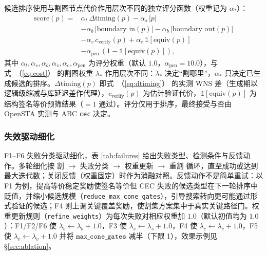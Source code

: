 \documentclass[journal]{IEEEtran}
\renewcommand{\eqref}[1]{\textup{（\ref{#1}）}}
\begin{document}
候选排序使用与割图节点代价作用层次不同的独立评分函数（权重记为 $\alpha_*$）：
{\small
\begin{equation}\label{eq:score}
\begin{split}
\mathrm{score}(p) = {}&\alpha_t\,\Delta\mathrm{timing}(p) - \alpha_s\,|p| \\
&- \alpha_b\,|\mathrm{boundary\_in}(p)| - \alpha_b\,|\mathrm{boundary\_out}(p)| \\
&- \alpha_v\,c_{\mathrm{verify}}(p) + \alpha_e\,\mathbb{1}[\mathrm{equiv}(p)] \\
&- \alpha_{\mathrm{pen}}\,(1-\mathbb{1}[\mathrm{equiv}(p)]),
\end{split}
\end{equation}
}
其中 $\alpha_t,\alpha_s,\alpha_b,\alpha_v,\alpha_e,\alpha_{\mathrm{pen}}$ 为评分权重（默认 $1.0$，$\alpha_{\mathrm{pen}}=10.0$），与式~\eqref{eq:cost} 的割图权重 $\lambda_*$ 作用层次不同：$\lambda_*$ 决定“割哪里”，$\alpha_*$ 只决定已生成候选的排序。$\Delta\mathrm{timing}(p)$ 即式~\eqref{eq:dtiming} 的实测 WNS 差（生成期以逻辑级缩减与库延迟差作代理），$c_{\mathrm{verify}}(p)$ 为估计验证代价，$\mathbb{1}[\mathrm{equiv}(p)]$ 为结构签名等价预筛结果（$=1$ 通过）。评分仅用于排序，最终接受与否由 OpenSTA 实测与 ABC \texttt{cec} 决定。

\subsubsection{失效驱动细化}
F1--F6 失败分类驱动细化，表 \ref{tab:failures} 给出失败类型、检测条件与反馈动作。多轮细化按 割 $\rightarrow$ 失败分类 $\rightarrow$ 权重更新 $\rightarrow$ 重割 循环，直至成功或达到最大迭代数；关闭反馈（权重固定）时作为消融对照。反馈动作不是简单重试：以 F1 为例，提高等价稳定奖励使签名等价但 CEC 失败的候选类型在下一轮排序中贬值，并缩小候选规模（\texttt{reduce\_max\_cone\_gates}），引导搜索转向更可能通过形式验证的候选；F4 则上调关键覆盖奖励，使割集方案集中于真实关键路径门。权重更新规则（\texttt{refine\_weights}）为每次失败对相应权重加 $1.0$（默认初值均为 $1.0$）：F1/F2/F6 使 $\lambda_b\leftarrow\lambda_b+1.0$，F3 使 $\lambda_s\leftarrow\lambda_s+1.0$，F4 使 $\lambda_c\leftarrow\lambda_c+1.0$，F5 使 $\lambda_v\leftarrow\lambda_v+1.0$ 并将 $\texttt{max\_cone\_gates}$ 减半（下限 1），效果示例见 \S\ref{sec:ablation}。
\end{document}
